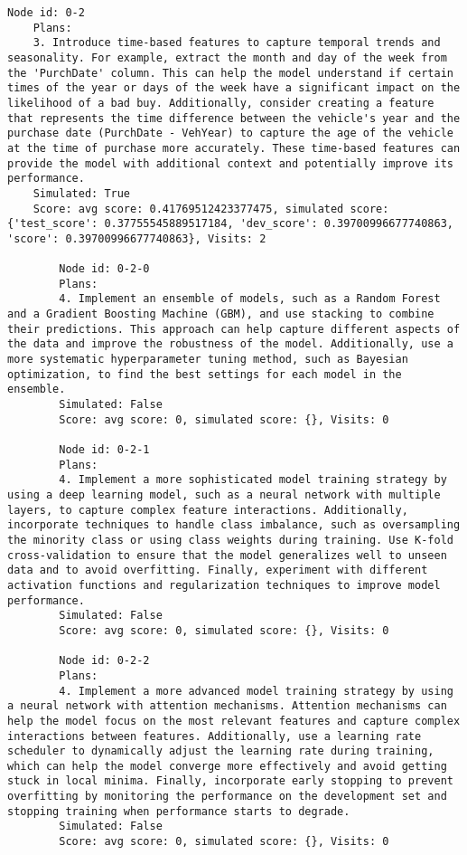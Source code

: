 \begin{lstlisting}[style=txtfile]
	Node id: 0-2
	Plans: 
	3. Introduce time-based features to capture temporal trends and seasonality. For example, extract the month and day of the week from the 'PurchDate' column. This can help the model understand if certain times of the year or days of the week have a significant impact on the likelihood of a bad buy. Additionally, consider creating a feature that represents the time difference between the vehicle's year and the purchase date (PurchDate - VehYear) to capture the age of the vehicle at the time of purchase more accurately. These time-based features can provide the model with additional context and potentially improve its performance.
	Simulated: True
	Score: avg score: 0.41769512423377475, simulated score: {'test_score': 0.37755545889517184, 'dev_score': 0.39700996677740863, 'score': 0.39700996677740863}, Visits: 2

		Node id: 0-2-0
		Plans: 
		4. Implement an ensemble of models, such as a Random Forest and a Gradient Boosting Machine (GBM), and use stacking to combine their predictions. This approach can help capture different aspects of the data and improve the robustness of the model. Additionally, use a more systematic hyperparameter tuning method, such as Bayesian optimization, to find the best settings for each model in the ensemble.
		Simulated: False
		Score: avg score: 0, simulated score: {}, Visits: 0

		Node id: 0-2-1
		Plans: 
		4. Implement a more sophisticated model training strategy by using a deep learning model, such as a neural network with multiple layers, to capture complex feature interactions. Additionally, incorporate techniques to handle class imbalance, such as oversampling the minority class or using class weights during training. Use K-fold cross-validation to ensure that the model generalizes well to unseen data and to avoid overfitting. Finally, experiment with different activation functions and regularization techniques to improve model performance.
		Simulated: False
		Score: avg score: 0, simulated score: {}, Visits: 0

		Node id: 0-2-2
		Plans: 
		4. Implement a more advanced model training strategy by using a neural network with attention mechanisms. Attention mechanisms can help the model focus on the most relevant features and capture complex interactions between features. Additionally, use a learning rate scheduler to dynamically adjust the learning rate during training, which can help the model converge more effectively and avoid getting stuck in local minima. Finally, incorporate early stopping to prevent overfitting by monitoring the performance on the development set and stopping training when performance starts to degrade.
		Simulated: False
		Score: avg score: 0, simulated score: {}, Visits: 0


\end{lstlisting}
